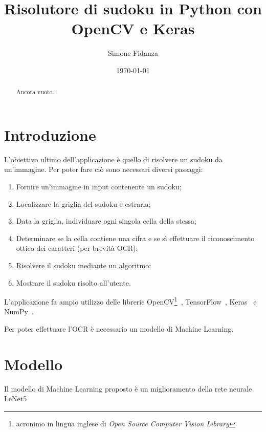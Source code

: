 \documentclass[a4paper, 10pt]{article}
\begin{document}
\title{Risolutore di sudoku in Python con OpenCV e Keras}
\author{Simone Fidanza}
\date{\today}


\maketitle

\begin{abstract}
    Ancora vuoto...
\end{abstract}


\section{Introduzione}\label{sec:introduzione}

L'obiettivo ultimo dell'applicazione è quello di risolvere un sudoku da
un'immagine. Per poter fare ciò sono necessari diversi passaggi:

\begin{enumerate}
    \item Fornire un'immagine in input contenente un sudoku;
    \item Localizzare la griglia del sudoku e estrarla;
    \item Data la griglia, individuare ogni singola cella della stessa;
    \item Determinare se la cella contiene una cifra e se sì effettuare il
        riconoscimento ottico dei caratteri (per brevità OCR);
    \item Risolvere il sudoku mediante un algoritmo;
    \item Mostrare il sudoku risolto all'utente.
\end{enumerate}

L'applicazione fa ampio utilizzo delle librerie OpenCV\footnote{acronimo in
lingua inglese di \emph{Open Source Computer Vision Library}
}~\cite{opencv_library}, TensorFlow~\cite{tensorflow2015-whitepaper},
Keras~\cite{chollet2015keras} e NumPy~\cite{harris2020array}.

Per poter effettuare l'OCR è necessario un modello di Machine Learning.


\section{Modello}

Il modello di Machine Learning proposto è un miglioramento della rete neurale
LeNet5~\cite{lecun1998gradient}



\bigskip
\printbibliography
\end{document}
